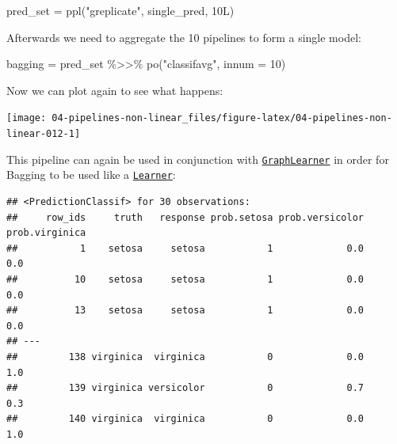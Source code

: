 \documentclass[
]{scrbook}
\newenvironment{Shaded}{\begin{snugshade}}{\end{snugshade}}
\newcommand{\AttributeTok}[1]{\textcolor[rgb]{0.77,0.63,0.00}{#1}}
\newcommand{\ConstantTok}[1]{\textcolor[rgb]{0.00,0.00,0.00}{#1}}
\newcommand{\DecValTok}[1]{\textcolor[rgb]{0.00,0.00,0.81}{#1}}
\newcommand{\FunctionTok}[1]{\textcolor[rgb]{0.00,0.00,0.00}{#1}}
\newcommand{\NormalTok}[1]{#1}
\newcommand{\OtherTok}[1]{\textcolor[rgb]{0.56,0.35,0.01}{#1}}
\newcommand{\SpecialCharTok}[1]{\textcolor[rgb]{0.00,0.00,0.00}{#1}}
\newcommand{\StringTok}[1]{\textcolor[rgb]{0.31,0.60,0.02}{#1}}
\renewenvironment{Shaded} {\begin{snugshade}\small} {\end{snugshade}}
\begin{document}
\begin{Shaded}
\begin{Highlighting}[]
\NormalTok{pred\_set }\OtherTok{=} \FunctionTok{ppl}\NormalTok{(}\StringTok{"greplicate"}\NormalTok{, single\_pred, 10L)}
\end{Highlighting}
\end{Shaded}

Afterwards we need to aggregate the 10 pipelines to form a single model:

\begin{Shaded}
\begin{Highlighting}[]
\NormalTok{bagging }\OtherTok{=}\NormalTok{ pred\_set }\SpecialCharTok{\%\textgreater{}\textgreater{}\%}
  \FunctionTok{po}\NormalTok{(}\StringTok{"classifavg"}\NormalTok{, }\AttributeTok{innum =} \DecValTok{10}\NormalTok{)}
\end{Highlighting}
\end{Shaded}

Now we can plot again to see what happens:

\begin{Shaded}
\end{Shaded}

\begin{center}\texttt{[image: 04-pipelines-non-linear\_files/figure-latex/04-pipelines-non-linear-012-1]} \end{center}

This pipeline can again be used in conjunction with \href{https://mlr3pipelines.mlr-org.com/reference/mlr_learners_graph.html}{\texttt{GraphLearner}} in order for Bagging to be used like a \href{https://mlr3.mlr-org.com/reference/Learner.html}{\texttt{Learner}}:

\begin{Shaded}
\end{Shaded}

\begin{verbatim}
## <PredictionClassif> for 30 observations:
##     row_ids     truth   response prob.setosa prob.versicolor prob.virginica
##           1    setosa     setosa           1             0.0            0.0
##          10    setosa     setosa           1             0.0            0.0
##          13    setosa     setosa           1             0.0            0.0
## ---                                                                        
##         138 virginica  virginica           0             0.0            1.0
##         139 virginica versicolor           0             0.7            0.3
##         140 virginica  virginica           0             0.0            1.0
\end{verbatim}
\end{document}
